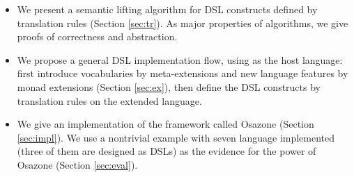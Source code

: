 \begin{itemize}
  \item We present a semantic lifting algorithm for DSL constructs defined by translation rules (Section \ref{sec:tr}).
    As major properties of algorithms, we give proofs of correctness and abstraction. 
  \item We propose a general DSL implementation flow, using \STLC{} as the host language:
    first introduce vocabularies by meta-extensions and new language features by monad extensions (Section \ref{sec:ex}),
    then define the DSL constructs by translation rules on the extended language.
  \item We give an implementation of the framework called Osazone (Section \ref{sec:impl}).
    We use a nontrivial example with seven language implemented (three of them are designed as DSLs) as the evidence for the power of Osazone (Section \ref{sec:eval}).
\end{itemize}

